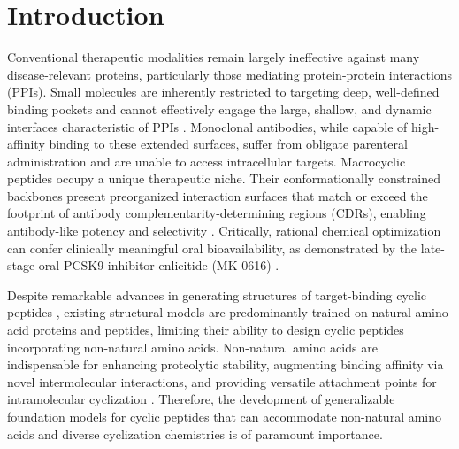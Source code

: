 \section{Introduction}\label{sec:introduction}

Conventional therapeutic modalities remain largely ineffective against many disease-relevant proteins, particularly those mediating protein-protein interactions (PPIs). Small molecules are inherently restricted to targeting deep, well-defined binding pockets and cannot effectively engage the large, shallow, and dynamic interfaces characteristic of PPIs \citep{bojadzic2018toward}. Monoclonal antibodies, while capable of high-affinity binding to these extended surfaces, suffer from obligate parenteral administration and are unable to access intracellular targets.
Macrocyclic peptides occupy a unique therapeutic niche. Their conformationally constrained backbones present preorganized interaction surfaces that match or exceed the footprint of antibody complementarity-determining regions (CDRs), enabling antibody-like potency and selectivity \citep{zorzi2017cyclic}. Critically, rational chemical optimization can confer clinically meaningful oral bioavailability, as demonstrated by the late-stage oral PCSK9 inhibitor enlicitide (MK-0616) \citep{gare2025lead}.


Despite remarkable advances in generating structures of target-binding cyclic peptides \citep{rettie2025accurate,rettie2025cyclic}, existing structural models are predominantly trained on natural amino acid proteins and peptides, limiting their ability to design cyclic peptides incorporating non-natural amino acids. Non-natural amino acids are indispensable for enhancing proteolytic stability, augmenting binding affinity via novel intermolecular interactions, and providing versatile attachment points for intramolecular cyclization \citep{hickey2023beyond}. Therefore, the development of generalizable foundation models for cyclic peptides that can accommodate non-natural amino acids and diverse cyclization chemistries is of paramount importance.


